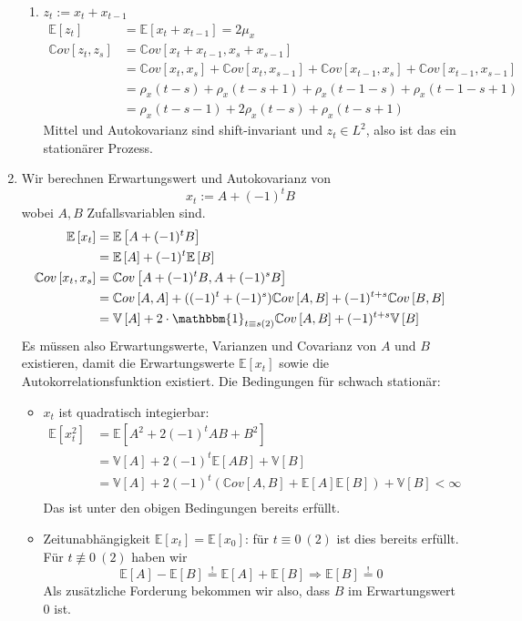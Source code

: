 \documentclass[a4paper,11pt,notitlepage,fullpage]{article}
\newcommand{\Ee}[1]{\mathbb E\left[#1\right]}
\newcommand{\Vv}[1]{\mathbb V\left[#1\right]}
\newcommand{\Cov}[1]{\mathbb Cov\left[#1\right]}
\newcommand{\ind}{\mathbbm{1}}
\begin{document}
\begin{enumerate}
\begin{enumerate}
\item $z_t := x_t + x_{t-1}$
\begin{align*}
\Ee{z_t} &= \Ee{ x_t + x_{t-1}} = 2\mu_x\\
\Cov{z_t, z_s} &= \Cov{x_t + x_{t-1}, x_s + x_{s-1}} \\
&= \Cov{x_t , x_s} + \Cov{x_t ,x_{s-1}} + \Cov{x_{t-1}, x_s} + \Cov{x_{t-1},x_{s-1}}\\
&= \rho_x(t-s) + \rho_x(t-s+1) + \rho_x(t-1-s) + \rho_x(t-1-s+1)\\
&= \rho_x(t-s-1) + 2\rho_x(t-s) + \rho_x(t-s+1)
\end{align*}
Mittel und Autokovarianz sind shift-invariant und $z_t\in L^2$, also ist das ein stationärer Prozess.
\end{enumerate}

\item Wir berechnen Erwartungswert und Autokovarianz von
$$x_t := A + (-1)^t B$$
wobei $A, B$ Zufallsvariablen sind.
\begin{align*}
\Ee{x_t} &= \Ee{A + (-1)^t B} \\
&= \Ee{A} + (-1)^t \Ee{B} \\
\Cov{x_t, x_s} &= \Cov{A + (-1)^t B, A + (-1)^s B} \\
&= \Cov{A, A} + ((-1)^t + (-1)^s) \Cov{A, B} + (-1)^{t+s} \Cov{B, B} \\
&= \Vv{A} + 2\cdot \ind_{t \equiv s(2)} \Cov{A, B} + (-1)^{t+s} \Vv{B}
\end{align*}
Es müssen also Erwartungswerte, Varianzen und Covarianz von $A$ und $B$ existieren, damit die Erwartungswerte $\Ee{x_t}$ sowie die Autokorrelationsfunktion existiert. Die Bedingungen für schwach stationär:
\begin{itemize}
\item $x_t$ ist quadratisch integierbar:
\begin{align*}
\Ee{x_t^2} &= \Ee{A^2 + 2(-1)^tAB + B^2} \\
&= \Vv A + 2(-1)^t\Ee{AB} + \Vv B \\
&= \Vv A + 2(-1)^t(\Cov{A, B} + \Ee A \Ee B) + \Vv B < \infty \\
\end{align*}
Das ist unter den obigen Bedingungen bereits erfüllt.
\item Zeitunabhängigkeit $\Ee{x_t} = \Ee{x_0}$: für $t\equiv0~(2)$ ist dies bereits erfüllt. Für $t\not\equiv0~(2)$ haben wir
$$\Ee{A} - \Ee{B} \stackrel{!}{=} \Ee{A} + \Ee{B} \Rightarrow \Ee{B} \stackrel{!}{=} 0$$
Als zusätzliche Forderung bekommen wir also, dass $B$ im Erwartungswert $0$ ist.

\end{itemize}
\end{enumerate}
\end{document}
